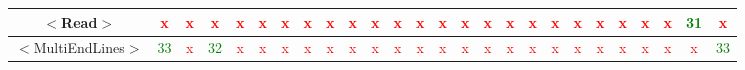\documentclass{article}
\begin{document}
\begin{center}
\begin{table}[H]
\begin{tabular}{|c|c|c|c|c|c|c|c|c|c|c|c|c|c|c|c|c|c|c|c|c|c|c|c|c|c|}
\hline
 $<$Read$>$         & \textcolor{red}{x}    & \textcolor{red}{x}  & \textcolor{red}{x}    & \textcolor{red}{x}    & \textcolor{red}{x}     & \textcolor{red}{x}  & \textcolor{red}{x}     & \textcolor{red}{x}     & \textcolor{red}{x}    & \textcolor{red}{x}     & \textcolor{red}{x}     & \textcolor{red}{x}     & \textcolor{red}{x}     & \textcolor{red}{x}     & \textcolor{red}{x}  & \textcolor{red}{x}     & \textcolor{red}{x}     & \textcolor{red}{x}     & \textcolor{red}{x}     & \textcolor{red}{x}     & \textcolor{red}{x}  & \textcolor{red}{x}    & \textcolor{red}{x}     & \textcolor{green}{31}   & \textcolor{red}{x} \\
\hline
 $<$MultiEndLines$>$         & \textcolor{green}{33}    & \textcolor{red}{x}  & \textcolor{green}{32}    & \textcolor{red}{x}    & \textcolor{red}{x}     & \textcolor{red}{x}  & \textcolor{red}{x}     & \textcolor{red}{x}     & \textcolor{red}{x}    & \textcolor{red}{x}     & \textcolor{red}{x}     & \textcolor{red}{x}     & \textcolor{red}{x}     & \textcolor{red}{x}     & \textcolor{red}{x}  & \textcolor{red}{x}     & \textcolor{red}{x}     & \textcolor{red}{x}     & \textcolor{red}{x}     & \textcolor{red}{x}     & \textcolor{red}{x}  & \textcolor{red}{x}    & \textcolor{red}{x}     & \textcolor{red}{x}   & \textcolor{green}{33} \\
\hline
\end{tabular}
\end{table}
\end{center}
\end{document}
